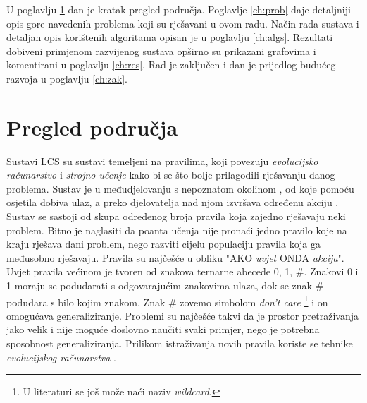 \documentclass[times, utf8, zavrsni]{fer}
\begin{document}
U poglavlju \ref{ch:podr} dan je kratak pregled područja.
Poglavlje \ref{ch:prob} daje detaljniji opis gore navedenih problema koji su rješavani u ovom radu.
Način rada sustava i detaljan opis korištenih algoritama opisan je u poglavlju \ref{ch:algs}.
Rezultati dobiveni primjenom razvijenog sustava opširno su prikazani grafovima i komentirani u poglavlju \ref{ch:res}.
Rad je zaključen i dan je prijedlog budućeg razvoja u poglavlju \ref{ch:zak}.

\chapter{Pregled područja} \label{ch:podr}
Sustavi LCS su sustavi temeljeni na pravilima, koji povezuju \emph{evolucijsko računarstvo} i \emph{strojno učenje} kako bi se što bolje prilagodili rješavanju danog problema.
Sustav je u međudjelovanju s nepoznatom okolinom , od koje pomoću osjetila  dobiva ulaz, a preko djelovatelja  nad njom izvršava određenu akciju \citep{4}.
Sustav se sastoji od skupa određenog broja pravila koja zajedno rješavaju neki problem.
Bitno je naglasiti da poanta učenja nije pronaći jedno pravilo koje na kraju rješava dani problem, nego razviti cijelu populaciju pravila koja ga međusobno rješavaju.
Pravila su najčešće u obliku "AKO \emph{uvjet} ONDA \emph{akcija}".
Uvjet pravila većinom je tvoren od znakova ternarne abecede {0, 1, \#}.
Znakovi 0 i 1 moraju se podudarati s odgovarajućim znakovima ulaza, dok se znak \# podudara s bilo kojim znakom.
Znak \# zovemo simbolom \emph{don't care} \footnote{U literaturi se još može naći naziv \emph{wildcard}.} i on omogućava generaliziranje.
Problemi su najčešće takvi da je prostor pretraživanja jako velik i nije moguće doslovno naučiti svaki primjer, nego je potrebna sposobnost generaliziranja.
Prilikom istraživanja novih pravila koriste se tehnike \emph{evolucijskog računarstva} .
\end{document}
